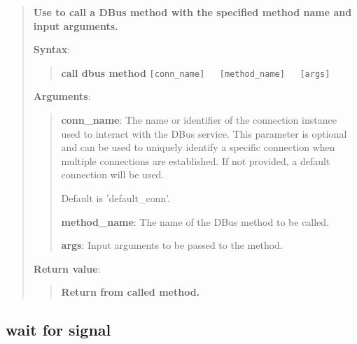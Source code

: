 \begin{quote}
\textbf{Use to call a DBus method with the specified method name and input arguments.}

\textbf{Syntax}:
\begin{quote}
\textbf{call dbus method}
\texttt{{[}conn\_name{]}\ \ \ {[}method\_name{]}\ \ \ {[}args{]}}
\end{quote}

\textbf{Arguments}:

\begin{quote}
\textbf{conn\_name}: The name or identifier of the connection instance used to interact with the DBus service.
  This parameter is optional and can be used to uniquely identify a specific connection
  when multiple connections are established. If not provided, a default connection will be used.
  
  Default is 'default\_conn'.
  
\vspace{\baselineskip}

\textbf{method\_name}: The name of the DBus method to be called.

\vspace{\baselineskip}

\textbf{args}: Input arguments to be passed to the method.
\end{quote}

\textbf{Return value}:

\begin{quote}
\textbf{Return from called method.}
\end{quote}
\end{quote}


\hypertarget{description-wait-for-signal}{%
\subsection{\texorpdfstring{\textbf{wait for signal}}{wait for signal}}\label{description-wait-for-signal}}

